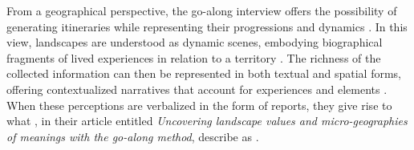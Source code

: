 \begin{refsegment}
From a geographical perspective, the go-along interview offers the possibility of generating itineraries while representing their progressions and dynamics \textcolor{blue}{\autocite[94]{jones_spatial_2012}}. In this view, landscapes are understood as dynamic scenes, embodying biographical fragments of lived experiences in relation to a territory \textcolor{blue}{\autocite[112]{bergeron_uncovering_2014}}. The richness of the collected information can then be represented in both textual and spatial forms, offering contextualized narratives that account for  experiences and  elements \textcolor{blue}{\autocite[109]{bergeron_uncovering_2014}}. When these perceptions are verbalized in the form of reports, they give rise to what \textcolor{blue}{\textcite[116]{bergeron_uncovering_2014}}, in their article entitled \textsl{Uncovering landscape values and micro-geographies of meanings with the go-along method}, describe as .%


\end{refsegment}
